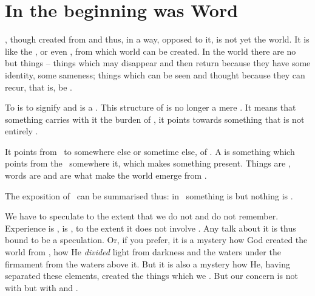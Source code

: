 \section{In the beginning was Word}\label{se:begWord}   
%
\pa {}, though created from  and thus, in a way, opposed
to it, is not yet the world.  It is like the , or even
, from which world can be created.  In the world there are no
 but things -- things which may disappear and then return
because they have some identity, some {sameness}; things which can be seen and
thought because they can recur, that is, be .

To  is to {signify} and  is a . This
structure of  is no longer a mere . It means that
something  carries with it the burden of , it
points towards something that is not entirely .

It points from \herenow\ to somewhere else or sometime else,  of
\herenow.  A  is something which points from the \hoa\ somewhere
 it, which makes something  present.
  Things are , words are  and
 are what make the world emerge from .

\pa\label{pa:speculation} The exposition of \pexp\ can be summarised thus: in
\pexp\ something is  but nothing is .

We have to speculate to the extent that we do not  and do not
remember. {Experience is , is , to the extent it does not
  involve .} Any talk about it is thus bound to be a
speculation.  Or, if you prefer, it is a mystery how God created the world from
, how He {\em divided} light from darkness and the waters under
the firmament from the waters above it. But it is also a mystery how He, having
separated these  elements, created the things which we
. But our concern is not with  but with  and
.

